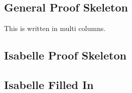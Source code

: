 \begin{figure}[H]
    \hfill
    \hfill
    \hfill
\end{figure}


\subsection{General Proof Skeleton}
\label{app:sb3}
This is written in multi columns. 
\begin{multicols}{2}
\end{multicols}

\subsection{Isabelle Proof Skeleton}
\label{app:sb4}
\begin{multicols}{2}
\end{multicols}

\subsection{Isabelle Filled In}
\label{app:sb5}
\begin{multicols}{2}
\end{multicols}

